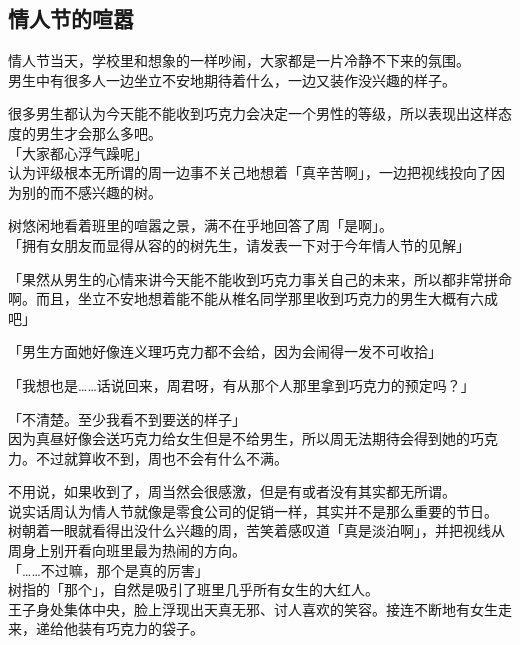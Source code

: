 \subsection{情人节的喧嚣}

情人节当天，学校里和想象的一样吵闹，大家都是一片冷静不下来的氛围。\\

男生中有很多人一边坐立不安地期待着什么，一边又装作没兴趣的样子。

很多男生都认为今天能不能收到巧克力会决定一个男性的等级，所以表现出这样态度的男生才会那么多吧。\\

「大家都心浮气躁呢」\\

认为评级根本无所谓的周一边事不关己地想着「真辛苦啊」，一边把视线投向了因为别的而不感兴趣的树。

树悠闲地看着班里的喧嚣之景，满不在乎地回答了周「是啊」。\\

「拥有女朋友而显得从容的的树先生，请发表一下对于今年情人节的见解」

「果然从男生的心情来讲今天能不能收到巧克力事关自己的未来，所以都非常拼命啊。而且，坐立不安地想着能不能从椎名同学那里收到巧克力的男生大概有六成吧」

「男生方面她好像连义理巧克力都不会给，因为会闹得一发不可收拾」

「我想也是……话说回来，周君呀，有从那个人那里拿到巧克力的预定吗？」

「不清楚。至少我看不到要送的样子」\\

因为真昼好像会送巧克力给女生但是不给男生，所以周无法期待会得到她的巧克力。不过就算收不到，周也不会有什么不满。

不用说，如果收到了，周当然会很感激，但是有或者没有其实都无所谓。\\

说实话周认为情人节就像是零食公司的促销一样，其实并不是那么重要的节日。\\

树朝着一眼就看得出没什么兴趣的周，苦笑着感叹道「真是淡泊啊」，并把视线从周身上别开看向班里最为热闹的方向。\\

「……不过嘛，那个是真的厉害」\\

树指的「那个」，自然是吸引了班里几乎所有女生的大红人。\\

王子身处集体中央，脸上浮现出天真无邪、讨人喜欢的笑容。接连不断地有女生走来，递给他装有巧克力的袋子。

